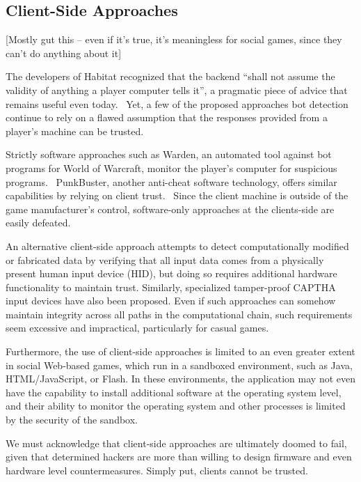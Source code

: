 \documentclass{acm_proc_article-sp}
\begin{document}
\subsection{Client-Side Approaches}

[Mostly gut this -- even if it's true, it's meaningless for social games, since they can't do anything about it]

The developers of Habitat recognized that the backend ``shall not assume the validity of anything a player computer tells it'', a pragmatic piece of advice that remains useful even today.~\cite{habitat} Yet, a few of the proposed approaches bot detection continue to rely on a flawed assumption that the responses provided from a player's machine can be trusted.

Strictly software approaches such as Warden, an automated tool against bot programs for World of Warcraft, monitor the player's computer for suspicious programs.~\cite{serverside} PunkBuster, another anti-cheat software technology, offers similar capabilities by relying on client trust.~\cite{punk} Since the client machine is outside of the game manufacturer's control,  software-only approaches at the clients-side are easily defeated.~\cite{exploit}

An alternative client-side approach attempts to detect computationally modified or fabricated data by verifying that all input data comes from a physically present human input device (HID), but doing so requires additional hardware functionality to maintain trust. Similarly, specialized tamper-proof CAPTHA input devices have also been proposed. Even if such approaches can somehow maintain integrity across all paths in the computational chain, such requirements seem excessive and impractical, particularly for casual games.

Furthermore, the use of client-side approaches is limited to an even greater extent in social Web-based games, which run in a sandboxed environment, such as Java, HTML/JavaScript, or Flash. In these environments, the application may not even have the capability to install additional software at the operating system level, and their ability to monitor the operating system and other processes is limited by the security of the sandbox.

We must acknowledge that client-side approaches are ultimately doomed to fail, given that determined hackers are more than willing to design firmware and even hardware level countermeasures. Simply put, clients cannot be trusted.
\end{document}
